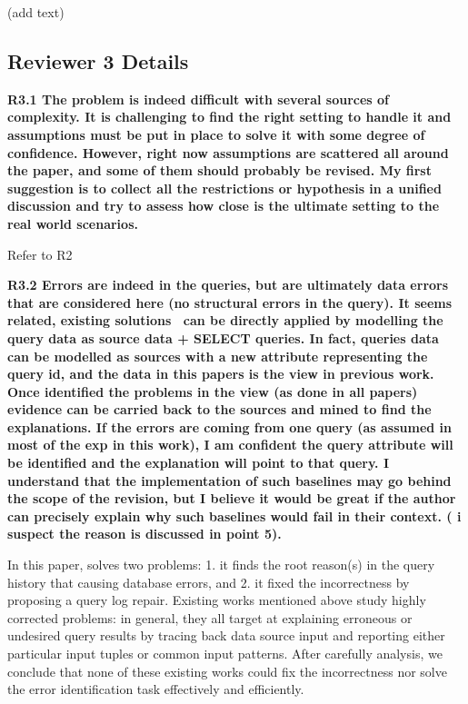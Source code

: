 (add text)
\subsection*{Reviewer 3 Details}

\noindent \textbf{R3.1 The problem is indeed difficult with several sources of complexity. It is challenging to find the right setting to handle it and assumptions must be put in place to solve it with some degree of confidence. However, right now assumptions are scattered all around the paper, and some of them should probably be revised.
My first suggestion is to collect all the restrictions or hypothesis in a unified discussion and try to assess how close is the ultimate setting to the real world scenarios.} 

{Refer to R2}

\noindent \textbf{R3.2 Errors are indeed in the queries, but are ultimately data errors that are considered here (no structural errors in the query). It seems related, existing solutions~\cite{Wu13, roy2014formal, chalamalla2014,meliou2011tracing} can be directly applied by modelling the query data as source data + SELECT queries. In fact, queries data can be modelled as sources with a new attribute representing the query id, and the data in this papers is the view in previous work. Once identified the problems in the view (as done in all papers) evidence can be carried back to the sources and mined to find the explanations. If the errors are coming from one query (as assumed in most of the exp in this work), I am confident the query attribute will be identified and the explanation will point to that query. I understand that the implementation of such baselines may go behind the scope of the revision, but I believe it would be great if the author can precisely explain why such baselines would fail in their context. ( i suspect the reason is discussed in point 5). }

In this paper, \sys solves two problems: 1. it finds the root reason(s) in the query history that causing database errors, and 2. it fixed the incorrectness by proposing a query log repair. Existing works mentioned above study highly corrected problems: in general, they all target at explaining erroneous or undesired query results by tracing back data source input and reporting either particular input tuples or common input patterns. After carefully analysis, we conclude that none of these existing works could fix the incorrectness nor solve the error identification task effectively and efficiently. 

